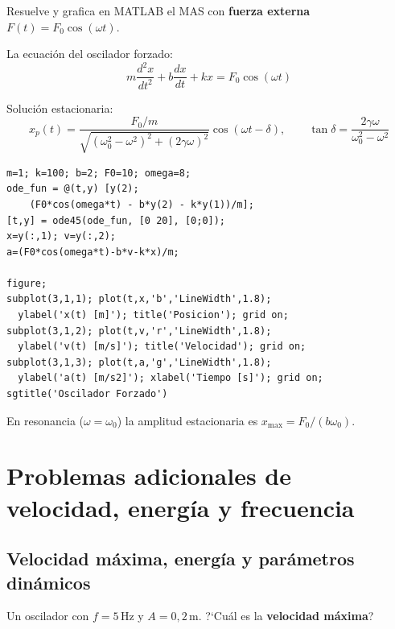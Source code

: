 \documentclass[12pt, a4paper, oneside]{book}
\newcommand{\ddt}[1]{\dfrac{d#1}{dt}}
\newcommand{\dddt}[1]{\dfrac{d^{2}#1}{dt^{2}}}
\newcommand{\Hz}{\,\text{Hz}}
\newcommand{\mts}{\,\text{m}}
\begin{document}
\begin{problema}[title={Problema~19 --- Nivel avanzado}]
Resuelve y grafica en MATLAB el MAS con \textbf{fuerza externa}
$F(t) = F_{0}\cos(\omega t)$.
\end{problema}

\begin{solucion}
La ecuaci\'on del oscilador forzado:
\[
  m\dddt{x} + b\ddt{x} + kx = F_{0}\cos(\omega t)
\]

Soluci\'on estacionaria:
\[
  x_{p}(t) = \dfrac{F_{0}/m}{\sqrt{(\omega_{0}^{2}-\omega^{2})^{2}+(2\gamma\omega)^{2}}}
             \cos(\omega t - \delta),\qquad
  \tan\delta = \dfrac{2\gamma\omega}{\omega_{0}^{2}-\omega^{2}}
\]

\begin{lstlisting}[style=matlab, caption={Oscilador forzado en MATLAB --- Problema 19}]
m=1; k=100; b=2; F0=10; omega=8;
ode_fun = @(t,y) [y(2);
    (F0*cos(omega*t) - b*y(2) - k*y(1))/m];
[t,y] = ode45(ode_fun, [0 20], [0;0]);
x=y(:,1); v=y(:,2);
a=(F0*cos(omega*t)-b*v-k*x)/m;

figure;
subplot(3,1,1); plot(t,x,'b','LineWidth',1.8);
  ylabel('x(t) [m]'); title('Posicion'); grid on;
subplot(3,1,2); plot(t,v,'r','LineWidth',1.8);
  ylabel('v(t) [m/s]'); title('Velocidad'); grid on;
subplot(3,1,3); plot(t,a,'g','LineWidth',1.8);
  ylabel('a(t) [m/s2]'); xlabel('Tiempo [s]'); grid on;
sgtitle('Oscilador Forzado')
\end{lstlisting}

\begin{nota}
En resonancia ($\omega = \omega_{0}$) la amplitud estacionaria es
$x_{\max} = F_{0}/(b\omega_{0})$.
\end{nota}
\end{solucion}

\chapter{Problemas adicionales de velocidad, energ\'ia y frecuencia}

\section{Velocidad m\'axima, energ\'ia y par\'ametros din\'amicos}

\begin{problema}[title={Problema~20}]
Un oscilador con $f = 5\Hz$ y $A = 0{,}2\mts$.
?`Cu\'al es la \textbf{velocidad m\'axima}?
\end{problema}
\end{document}
